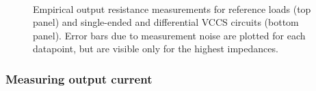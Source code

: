 \documentclass[conference]{IEEEtran}
\begin{document}
\begin{figure}[t!]
\begin{subfigure}{\textwidth}
\hspace{-4.6cm}
\caption*{}
\label{fig:output_resistance_empirical_ref}
\end{subfigure}
\ \\
\begin{subfigure}{\textwidth}
\hspace{-4.6cm}
\caption*{}
\label{fig:output_resistance_empirical_meas}
\end{subfigure}
\caption{\small Empirical output resistance measurements for reference loads (top panel) and single-ended and differential VCCS circuits (bottom panel). Error bars due to measurement noise are plotted for each datapoint, but are visible only for the highest impedances.}
\label{fig:output_resistance_empirical}
\end{figure}


\subsubsection{Measuring output current}
\end{document}
